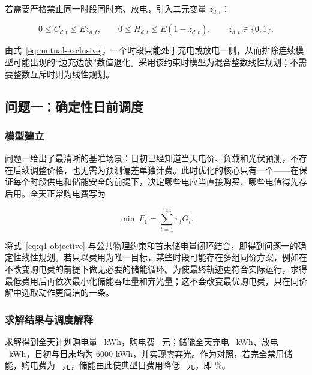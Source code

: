 若需要严格禁止同一时段同时充、放电，引入二元变量 $z_{d,t}$：

\begin{equation}
    0\le C_{d,t}\le\bar E z_{d,t},\qquad
    0\le H_{d,t}\le\bar E(1-z_{d,t}),
    \qquad z_{d,t}\in\{0,1\}.
    \label{eq:mutual-exclusive}
\end{equation}

由式~\eqref{eq:mutual-exclusive}，一个时段只能处于充电或放电一侧，从而排除连续模型可能出现的“边充边放”数值退化。采用该约束时模型为混合整数线性规划；不需要整数互斥时则为线性规划。

\subsection{问题一：确定性日前调度}

\subsubsection{模型建立}

问题一给出了最清晰的基准场景：日初已经知道当天电价、负载和光伏预测，不存在后续调整价格，也无需为预测偏差单独计费。此时优化的核心只有一个——在保证每个时段供电和储能安全的前提下，决定哪些电应当直接购买、哪些电值得先存后用。全天正常购电费写为

\begin{equation}
    \min\ F_1=\sum_{t=1}^{144}\pi_t G_t .
    \label{eq:q1-objective}
\end{equation}

将式~\eqref{eq:q1-objective} 与公共物理约束和首末储电量闭环结合，即得到问题一的确定性线性规划。若只以费用为唯一目标，某些时段可能存在多组同价方案，例如在不改变购电费的前提下做无必要的储能循环。为使最终轨迹更符合实际运行，求得最低费用后再依次最小化储能吞吐量和弃光量；这不会改变最优购电费，只在同价解中选取动作更简洁的一条。

\subsubsection{求解结果与调度解释}

\begingroup
\setlength{\emergencystretch}{1em}
求解得到全天计划购电量 \QoneEnergy\ kWh，购电费 \QoneCost\ 元；储能全天充电 \QoneCharge\ kWh、放电 \QoneDischarge\ kWh，日初与日末均为 $6000$ kWh，并实现零弃光。作为对照，若完全禁用储能，购电费为 \QoneNoStorage\ 元，储能由此使典型日费用降低 \QoneSave\ 元，即 \QoneSavePct\%。
\par
\endgroup

